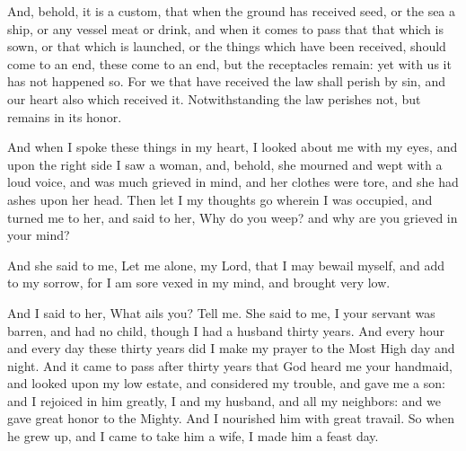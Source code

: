 {And, behold, it is a custom, that when the ground has received seed, or the sea a ship, or any vessel meat or drink, and when it comes to pass that that which is sown, or that which is launched,
or the things which have been received, should come to an end, these come to an end, but the receptacles remain: yet with us it has not happened so.
For we that have received the law shall perish by sin, and our heart also which received it.
Notwithstanding the law perishes not, but remains in its honor.
\par }{\PP {}And when I spoke these things in my heart, I looked about me with my eyes, and upon the right side I saw a woman, and, behold, she mourned and wept with a loud voice, and was much grieved in mind, and her clothes were tore, and she had ashes upon her head.
Then let I my thoughts go wherein I was occupied, and turned me to her,
and said to her, Why do you weep? and why are you grieved in your mind?
\par }{\PP {}And she said to me, Let me alone, my Lord, that I may bewail myself, and add to my sorrow, for I am sore vexed in my mind, and brought very low.
\par }{\PP {}And I said to her, What ails you? Tell me.
She said to me, I your servant was barren, and had no child, though I had a husband thirty years.
And every hour and every day these thirty years did I make my prayer to the Most High day and night.
And it came to pass after thirty years that God heard me your handmaid, and looked upon my low estate, and considered my trouble, and gave me a son: and I rejoiced in him greatly, I and my husband, and all my
 neighbors: and we gave great honor to the Mighty.
And I nourished him with great travail.
So when he grew up, and I came to take him a wife, I made him a feast day.

}
